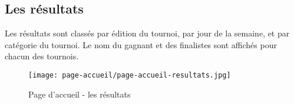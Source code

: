 \subsection{Les résultats}

Les résultats sont classés par édition du tournoi, par jour de la semaine, et par catégorie du tournoi. Le nom du gagnant et des finalistes sont affichés pour chacun des tournois.

\begin{figure}[H]
\centering
\texttt{[image: page-accueil/page-accueil-resultats.jpg]}
\caption{Page d'accueil - les résultats}
\end{figure}


